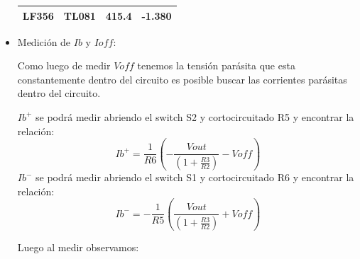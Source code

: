 \begin{itemize}
\begin{table}[h]
\begin{tabular}{cccc}
                LF356                                       & TL081 & 415.4                                       & -1.380 \\
                \hline
        \end{tabular}
    
    \end{table}
    
    \item Medición de $Ib$ y $Ioff$:
    
    Como luego de medir $Voff$ tenemos la tensión parásita que esta constantemente dentro del circuito es posible buscar las corrientes parásitas dentro del circuito.
    
    $Ib^+$ se podrá medir abriendo el switch S2 y cortocircuitado R5 y encontrar la relación:
    $$Ib^+ = \frac{1}{R6}\left(-\frac{Vout}{\left( 1 + \frac{R3}{R2}\right)}-Voff  \right) $$
    $Ib^-$ se podrá medir abriendo el switch S1 y cortocircuitado R6 y encontrar la relación:
    $$Ib^- = -\frac{1}{R5}\left( \frac{Vout}{\left( 1 + \frac{R3}{R2}\right)}+Voff  \right) $$    

    Luego al medir observamos:
    

\end{itemize}

